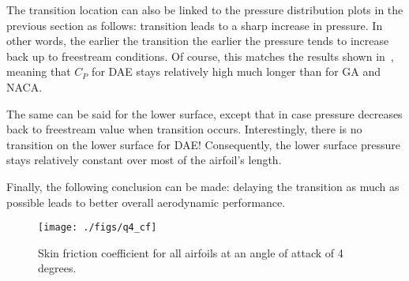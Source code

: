 The transition location can also be linked to the pressure distribution plots in the previous
section as follows:
transition leads to a sharp increase in pressure. In other words, the earlier the transition
the earlier the pressure tends to increase back up to freestream conditions. Of course, this
matches the results shown in~, meaning that $C_P$ for DAE stays relatively
high much longer than for GA and NACA.

The same can be said for the lower surface, except that in case pressure decreases back to
freestream value when transition occurs. Interestingly, there is no transition on the lower surface
for DAE! Consequently, the lower surface pressure stays relatively constant over most of the
airfoil's length.

Finally, the following conclusion can be made: delaying the transition as much
as possible leads to better overall aerodynamic performance.
\begin{figure}[H]
    \centering
    \texttt{[image: ./figs/q4\_cf]}
    \caption{Skin friction coefficient for all airfoils at an angle of attack of
        4 degrees.}\label{fig:q4_cf}
\end{figure}

